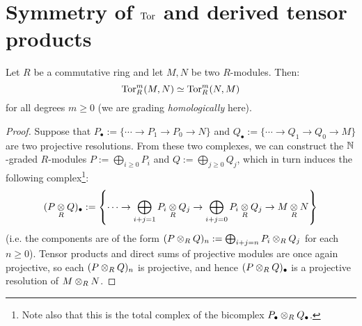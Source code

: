    \section{Symmetry of \texorpdfstring{$\mathrm{Tor}$}{} and derived tensor products}
        \begin{lemma} \label{lemma: symmetry_of_Tor}
            Let $R$ be a commutative ring and let $M, N$ be two $R$-modules. Then:
                $$\mathrm{Tor}_R^m(M, N) \simeq \mathrm{Tor}_R^m(N, M)$$
            for all degrees $m \geq 0$ (we are grading \textit{homologically} here).
        \end{lemma}
            \begin{proof}
                Suppose that $P_{\bullet} := \{\cdots \to P_1 \to P_0 \to N\}$ and $Q_{\bullet} := \{\cdots \to Q_1 \to Q_0 \to M\}$ are two projective resolutions. From these two complexes, we can construct the $\mathbb{N}$-graded $R$-modules $P := \bigoplus_{i \geq 0} P_i$ and $Q := \bigoplus_{j \geq 0} Q_j$, which in turn induces the following complex\footnote{Note also that this is the total complex of the bicomplex $P_{\bullet} \tensor_R Q_{\bullet}$.}:
                    $$(P \tensor_R Q)_{\bullet} := \left\{ \cdots \to \bigoplus_{i + j = 1} P_i \tensor_R Q_j \to \bigoplus_{i + j = 0} P_i \tensor_R Q_j \to M \tensor_R N \right\}$$
                (i.e. the components are of the form $(P \tensor_R Q)_n := \bigoplus_{i + j = n} P_i \tensor_R Q_j$ for each $n \geq 0$). Tensor products and direct sums of projective modules are once again projective, so each $(P \tensor_R Q)_n$ is projective, and hence $(P \tensor_R Q)_{\bullet}$ is a projective resolution of $M \tensor_R N$.


\end{proof}
